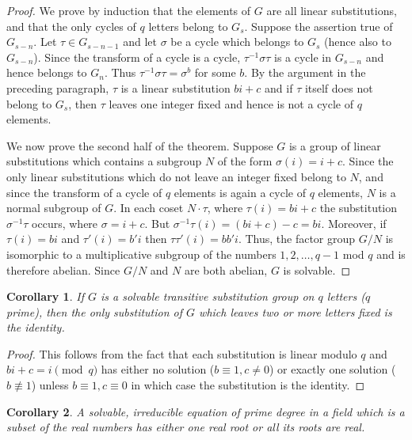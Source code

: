 \documentclass[10pt,leqno,a5paper]{book}
\newtheorem{coro}{Corollary}
\theoremstyle{definition}
\begin{document}
\begin{proof}
We prove by induction that the elements of $G$ are all linear substitutions, and that the only cycles of $q$ letters belong to $G_s$.
Suppose the assertion true of $G_{s-n}$.
Let $\tau \in G_{s-n-1}$ and let $\sigma$ be a cycle which belongs to $G_s$ (hence also to $G_{s-n}$).
Since the transform of a cycle is a cycle, $\tau^{-1} \sigma \tau$ is a cycle in $G_{s-n}$ and hence belongs to $G_n$.
Thus $\tau^{-1} \sigma\tau = \sigma^b$ for some $b$.
By the argument in the preceding paragraph, $\tau$ is a linear substitution $bi + c$ and if $\tau$ itself does not belong to $G_s$, then $\tau$ leaves one integer fixed and hence is not a cycle of $q$ elements.

We now prove the second half of the theorem.
Suppose $G$ is a group of linear substitutions which contains a subgroup $N$ of the form $\sigma(i) = i + c$.
Since the only linear substitutions which do not leave an integer fixed belong to $N$, and since the transform of a cycle of $q$ elements is again a cycle of $q$ elements, $N$ is a normal subgroup of $G$.
In each coset $N \cdot \tau$, where $\tau(i) = bi + c$ the substitution $\sigma^{-1}\tau$ occurs, where $\sigma = i + c$.
But $\sigma^{-1}\tau(i) = (bi + c) - c = bi$.
Moreover, if $\tau(i) = bi$ and $\tau'(i) = b'i$ then $\tau\tau'(i) = bb'i$.
Thus, the factor group $G/N$ is isomorphic to a multiplicative subgroup of the numbers $1,2,\ldots,q-1$ mod $q$ and is therefore abelian.
Since $G/N$ and $N$ are both abelian, $G$ is solvable.
\end{proof}


\begin{coro}
\label{coro:III.1.2}
If $G$ is a solvable transitive substitution group on $q$ letters ($q$ prime), then the only substitution of $G$ which leaves two or more letters fixed is the identity.
\end{coro}


\begin{proof}
This follows from the fact that each substitution is linear modulo $q$ and $bi + c = i \pmod q$ has either no solution ($b \equiv 1, c\not= 0$) or exactly one solution ($b \not\equiv 1$) unless $b \equiv 1, c \equiv 0$ in which case the substitution is the identity.
\end{proof}


\begin{coro}
\label{coro:III.2.2}
A solvable, irreducible equation of prime degree in a field which is a subset of the real numbers has either one real root or all its roots are real.
\end{coro}
\end{document}
